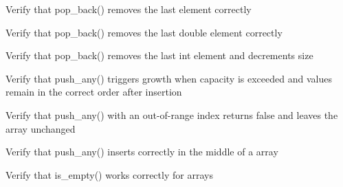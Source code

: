 \begin{DoxyRefList}
%
Verify that pop\+\_\+back() removes the last  element correctly  
\item[Global \doxylink{test__array_8cpp_a52c7ef86966af89e3ec314d238bc539d}{TEST\+\_\+F} (\doxylink{classArrayInitTest}{Array\+Init\+Test}, Pop\+Back\+Double\+Removes\+Last\+Element)]\label{test__test000034}%
%
Verify that pop\+\_\+back() removes the last double element correctly  
\item[Global \doxylink{test__array_8cpp_a99984b340096aad2e1374db8e98e73e1}{TEST\+\_\+F} (\doxylink{classArrayInitTest}{Array\+Init\+Test}, Pop\+Back\+Int\+Removes\+Last\+Element)]\label{test__test000033}%
%
Verify that pop\+\_\+back() removes the last int element and decrements size  
\item[Global \doxylink{test__array_8cpp_afd902087dc5ffa4616abe65d7d89b73a}{TEST\+\_\+F} (\doxylink{classArrayInitTest}{Array\+Init\+Test}, Push\+Any\+Triggers\+Growth)]\label{test__test000032}%
%
Verify that push\+\_\+any() triggers growth when capacity is exceeded and values remain in the correct order after insertion  
\item[Global \doxylink{test__array_8cpp_a887c63ee84ebe4b54e2e6e311d1b3de9}{TEST\+\_\+F} (\doxylink{classArrayInitTest}{Array\+Init\+Test}, Push\+Any\+Out\+Of\+Range\+Returns\+False)]\label{test__test000031}%
%
Verify that push\+\_\+any() with an out-\/of-\/range index returns false and leaves the array unchanged  
\item[Global \doxylink{test__array_8cpp_acb4167b32fe8ab6a76e0f3d998d7df9a}{TEST\+\_\+F} (\doxylink{classArrayInitTest}{Array\+Init\+Test}, Push\+Any\+Point\+Middle\+Insertion)]\label{test__test000030}%
%
Verify that push\+\_\+any() inserts correctly in the middle of a  array  
\item[Global \doxylink{test__array_8cpp_a74deee44fe3f460225eb60999db5df7b}{TEST\+\_\+F} (\doxylink{classArrayInitTest}{Array\+Init\+Test}, Is\+Empty\+Point\+Array)]\label{test__test000076}%
%
Verify that is\+\_\+empty() works correctly for  arrays  
\item[Global \doxylink{test__array_8cpp_adb658fcd81f7fc1d17705974d8c14ac9}{TEST\+\_\+F} (\doxylink{classArrayInitTest}{Array\+Init\+Test}, Push\+Any\+Int\+Middle\+Insertion)]\label{test__test000028}%
%

\end{DoxyRefList}
